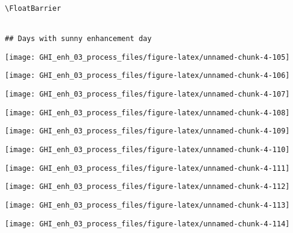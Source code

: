 \documentclass[
  10pt,
  a4paper,oneside]{article}
\begin{document}
\begin{verbatim}
 
 

\FloatBarrier


## Days with sunny enhancement day 
\end{verbatim}

\begin{center}\texttt{[image: GHI\_enh\_03\_process\_files/figure-latex/unnamed-chunk-4-105]} \end{center}

\begin{center}\texttt{[image: GHI\_enh\_03\_process\_files/figure-latex/unnamed-chunk-4-106]} \end{center}

\begin{center}\texttt{[image: GHI\_enh\_03\_process\_files/figure-latex/unnamed-chunk-4-107]} \end{center}

\begin{center}\texttt{[image: GHI\_enh\_03\_process\_files/figure-latex/unnamed-chunk-4-108]} \end{center}

\begin{center}\texttt{[image: GHI\_enh\_03\_process\_files/figure-latex/unnamed-chunk-4-109]} \end{center}

\begin{center}\texttt{[image: GHI\_enh\_03\_process\_files/figure-latex/unnamed-chunk-4-110]} \end{center}

\begin{center}\texttt{[image: GHI\_enh\_03\_process\_files/figure-latex/unnamed-chunk-4-111]} \end{center}

\begin{center}\texttt{[image: GHI\_enh\_03\_process\_files/figure-latex/unnamed-chunk-4-112]} \end{center}

\begin{center}\texttt{[image: GHI\_enh\_03\_process\_files/figure-latex/unnamed-chunk-4-113]} \end{center}

\begin{center}\texttt{[image: GHI\_enh\_03\_process\_files/figure-latex/unnamed-chunk-4-114]} \end{center}
\end{document}
